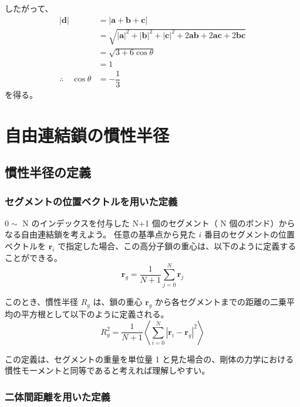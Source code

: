 \documentclass[uplatex,dvipdfmx,a4paper,11pt, titlepage]{jsarticle}
\begin{document}
\begin{appendix}
したがって、
\begin{align*}
|{\bm d} | 
	&= |{\bm a} + {\bm b} + {\bm c}| \\
	&= \sqrt{ |{\bm a}|^2 + |{\bm b}|^2 + |{\bm c}|^2 + 2{\bm a}{\bm b} + 2{\bm a}{\bm c} + 2{\bm b}{\bm c} } \\
	&= \sqrt{ 3 + 6 \cos \theta } \\
	&= 1 \\
\therefore \quad \cos \theta &= -\dfrac{1}{3}
\end{align*}
を得る。

\newpage

\section{自由連結鎖の慣性半径}
\label{sec:rg}

\subsection{慣性半径の定義}

\subsubsection{セグメントの位置ベクトルを用いた定義}

$0\sim$ N のインデックスを付与した N+1 個のセグメント（ N 個のボンド）からなる自由連結鎖を考えよう。
任意の基準点から見た $i$ 番目のセグメントの位置ベクトルを $\bm{r}_i$ で指定した場合、この高分子鎖の重心は、以下のように定義することができる。
\begin{equation*}
\bm{r}_g = \dfrac{1}{N+1} \sum_{j=0}^{N} \bm{r}_j
\end{equation*}

このとき、慣性半径 $R_g$ は、鎖の重心 $\bm{r}_g$ から各セグメントまでの距離の二乗平均の平方根として以下のように定義される。
\begin{equation*}
R_g^2 = \dfrac{1}{N+1} \left\langle \sum_{i=0}^{N} |\bm{r}_i - \bm{r}_g|^2 \right\rangle
\end{equation*}

この定義は、セグメントの重量を単位量 1 と見た場合の、剛体の力学における慣性モーメントと同等であると考えれば理解しやすい。

\subsubsection{二体間距離を用いた定義}


\end{appendix}
\end{document}
